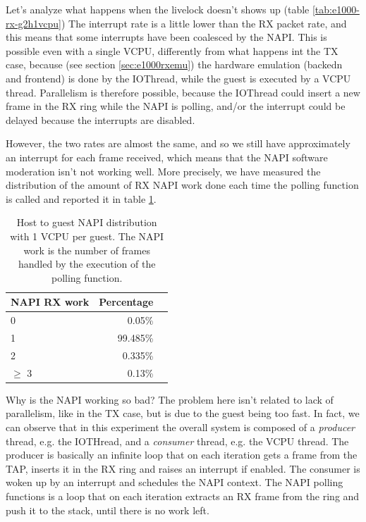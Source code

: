 \vspace{0.5cm}

Let's analyze what happens when the livelock doesn't shows up (table \ref{tab:e1000-rx-g2h1vcpu})
The interrupt rate is a little lower than the RX packet rate, and this means that some interrupts have been coalesced by the NAPI.
This is possible even with a single VCPU, differently from what happens int the TX case, because (see section \ref{sec:e1000rxemu})
the hardware emulation (backedn and frontend) is done by the IOThread, while the guest is executed by a VCPU thread. Parallelism is 
therefore possible, because the IOThread could insert a new frame in the RX ring while the NAPI is polling, and/or the interrupt could
be delayed because the interrupts are disabled.

However, the two rates are almost the same, and so we still have approximately an interrupt for each frame received, which means that
the NAPI software moderation isn't not working well. More precisely, we have measured the distribution of the amount of RX NAPI work
done each time the polling function is called and reported it in table \ref{tab:e1000-rx-napi-dist}.

\begin{table}
\begin{center}
\begin{tabular}{lrl}
\toprule
\textbf{NAPI RX work} & \textbf{Percentage}\\
\midrule
0 & 0.05\%\\
1 & 99.485\%\\
2 & 0.335\%\\
$\geq$ 3 & 0.13\%\\
\bottomrule
\end{tabular}
\end{center}
\caption{Host to guest NAPI distribution with 1 VCPU per guest. The NAPI work is the number of
frames handled by the execution of the polling function.}
\label{tab:e1000-rx-napi-dist}
\end{table}

Why is the NAPI working so bad? The problem here isn't related to lack of parallelism, like in the TX case, but is due to the guest being
too fast. In fact, we can observe that in this experiment the overall system is composed of a \emph{producer} thread, e.g. the IOTHread,
and a \emph{consumer} thread, e.g. the VCPU thread. The producer is basically an infinite loop that on each iteration gets a frame from the
TAP, inserts it in the RX ring and raises an interrupt if enabled. The consumer is woken up by an interrupt and schedules the NAPI context.
The NAPI polling functions is a loop that on each iteration extracts an RX frame from the ring and push it to the stack, until there is no
work left.


